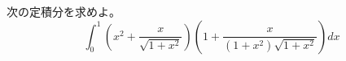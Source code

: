 \documentclass[../../main.tex]{subfiles}
\begin{document}
次の定積分を求めよ。
\[ \int_0^1 \left( x^2+\frac{x}{\sqrt{1+x^2}} \right)
\left( 1+\frac{x}{(1+x^2)\sqrt{1+x^2}} \right) dx \]
\end{document}
